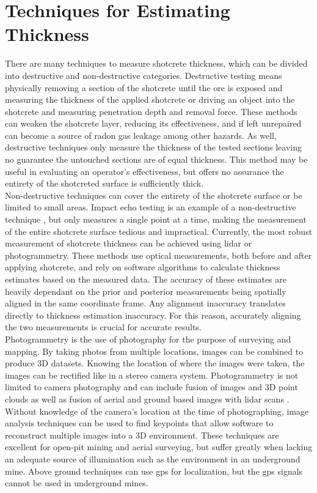 \section{Techniques for Estimating Thickness}

There are many techniques to measure shotcrete thickness, which can be divided into destructive and non-destructive categories. Destructive testing means physically removing a section of the shotcrete until the ore is exposed and measuring the thickness of the applied shotcrete or driving an object into the shotcrete and measuring penetration depth and removal force. These methods can weaken the shotcrete layer, reducing its effectiveness, and if left unrepaired can become a source of radon gas leakage among other hazards. As well, destructive techniques only measure the thickness of the tested sections leaving no guarantee the untouched sections are of equal thickness. This method may be useful in evaluating an operator's effectiveness, but offers no assurance the entirety of the shotcreted surface is sufficiently thick.\\

Non-destructive techniques can cover the entirety of the shotcrete surface or be limited to small areas. Impact echo testing is an example of a non-destructive technique \cite{impact}, but only measures a single point at a time, making the measurement of the entire shotcrete surface tedious and impractical. Currently, the most robust measurement of shotcrete thickness can be achieved using \acrshort{lidar} or photogrammetry. These methods use optical measurements, both before and after applying shotcrete, and rely on software algorithms to calculate thickness estimates based on the measured data. The accuracy of these estimates are heavily dependant on the prior and posterior measurements being spatially aligned in the same coordinate frame. Any alignment inaccuracy translates directly to thickness estimation inaccuracy. For this reason, accurately aligning the two measurements is crucial for accurate results.\\

Photogrammetry is the use of photography for the purpose of surveying and mapping. By taking photos from multiple locations, images can be combined to produce 3D datasets. Knowing the location of where the images were taken, the images can be rectified like in a stereo camera system. Photogrammetry is not limited to camera photography and can include fusion of images and 3D point clouds \cite{photo1} as well as fusion of aerial and ground based images with \acrshort{lidar} scans \cite{photo2}. Without knowledge of the camera's location at the time of photographing, image analysis techniques can be used to find keypoints that allow software to reconstruct multiple images into a 3D environment. These techniques are excellent for open-pit mining and aerial surveying, but suffer greatly when lacking an adequate source of illumination such as the environment in an underground mine. Above ground techniques can use \acrshort{gps} for localization, but the \acrshort{gps} signals cannot be used in underground mines.\\

